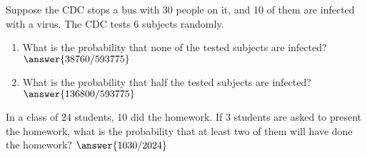 \documentclass{ximera}
\begin{document}
\begin{problem}
Suppose the CDC stops a bus with 30 people on it, and 10 of them are infected with a virus.  The CDC tests 6 subjects randomly.
\begin{enumerate}
\item What is the probability that none of the tested subjects are infected? $\answer{38760/593775}$
\item What is the probability that half the tested subjects are infected? $\answer{136800/593775}$
\end{enumerate}

\end{problem}


\begin{problem}
In a class of 24 students, 10 did the homework.  If 3 students are asked to present the homework, what is the probability that at least two of them will have done the homework? $\answer{1030/2024}$
\end{problem}
\end{document}
